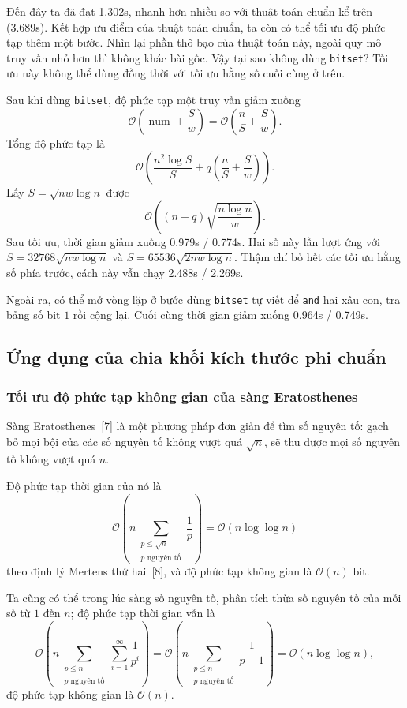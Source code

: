 \documentclass[11pt]{article}
\newcommand{\Oh}{\mathcal{O}}
\begin{document}
Đến đây ta đã đạt 1.302s, nhanh hơn nhiều so với thuật toán chuẩn kể trên
(3.689s). Kết hợp ưu điểm của thuật toán chuẩn, ta còn có thể tối ưu độ phức
tạp thêm một bước. Nhìn lại phần thô bạo của thuật toán này, ngoài quy mô truy
vấn nhỏ hơn thì không khác bài gốc. Vậy tại sao không dùng \texttt{bitset}?
Tối ưu này không thể dùng đồng thời với tối ưu hằng số cuối cùng ở trên.

Sau khi dùng \texttt{bitset}, độ phức tạp một truy vấn giảm xuống
\[
  \Oh\left(\operatorname{num}+\frac Sw\right)
  =
  \Oh\left(\frac nS+\frac Sw\right).
\]
Tổng độ phức tạp là
\[
  \Oh\left(\frac{n^2\log S}{S}
    +q\left(\frac nS+\frac Sw\right)\right).
\]
Lấy \(S=\sqrt{nw\log n}\) được
\[
  \Oh\left((n+q)\sqrt{\frac{n\log n}{w}}\right).
\]
Sau tối ưu, thời gian giảm xuống 0.979s / 0.774s. Hai số này lần lượt ứng với
\(S=32768\sqrt{nw\log n}\) và \(S=65536\sqrt{2nw\log n}\). Thậm chí bỏ hết các
tối ưu hằng số phía trước, cách này vẫn chạy 2.488s / 2.269s.

Ngoài ra, có thể mở vòng lặp ở bước dùng \texttt{bitset} tự viết để
\texttt{and} hai xâu con, tra bảng số bit \(1\) rồi cộng lại. Cuối cùng thời
gian giảm xuống 0.964s / 0.749s.

\subsection{Ứng dụng của chia khối kích thước phi chuẩn}

\subsubsection{Tối ưu độ phức tạp không gian của sàng Eratosthenes}

Sàng Eratosthenes~[7] là một phương pháp đơn giản để tìm số nguyên tố: gạch
bỏ mọi bội của các số nguyên tố không vượt quá \(\sqrt n\), sẽ thu được mọi
số nguyên tố không vượt quá \(n\).

Độ phức tạp thời gian của nó là
\[
  \Oh\left(n\sum_{\substack{p\le \sqrt n\\p\text{ nguyên tố}}}\frac1p\right)
  =
  \Oh(n\log\log n)
\]
theo định lý Mertens thứ hai~[8], và độ phức tạp không gian là \(\Oh(n)\) bit.

Ta cũng có thể trong lúc sàng số nguyên tố, phân tích thừa số nguyên tố của
mỗi số từ \(1\) đến \(n\); độ phức tạp thời gian vẫn là
\[
\Oh\left(
n\sum_{\substack{p\le n\\p\text{ nguyên tố}}}\sum_{i=1}^{\infty}\frac1{p^i}
\right)
=
\Oh\left(
n\sum_{\substack{p\le n\\p\text{ nguyên tố}}}\frac1{p-1}
\right)
=
\Oh(n\log\log n),
\]
độ phức tạp không gian là \(\Oh(n)\).
\end{document}
